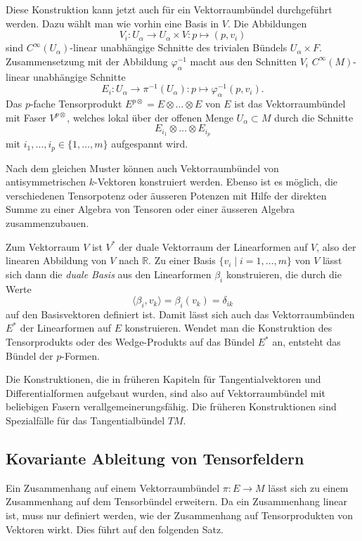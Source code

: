 Diese Konstruktion kann jetzt auch für ein Vektorraumbündel
durchgeführt werden.
Dazu wählt man wie vorhin eine Basis in $V$. 
Die Abbildungen
\[
V_i
\colon
U_\alpha \to U_\alpha\times V
:
p\mapsto (p,v_i)
\]
sind $C^\infty(U_\alpha)$-linear unabhängige Schnitte des trivialen
Bündels $U_\alpha\times F$.
Zusammensetzung mit der Abbildung $\varphi_\alpha^{-1}$ macht aus den
Schnitten $V_i$ $C^\infty(M)$-linear unabhängige Schnitte
\[
E_i
\colon
U_\alpha \to \pi^{-1}(U_\alpha)
:
p \mapsto \varphi_\alpha^{-1}(p,v_i).
\]
Das $p$-fache Tensorprodukt $E^{p\otimes}=E\otimes\dots\otimes E$ von $E$ 
ist das Vektorraumbündel mit Faser $V^{p\otimes}$, welches lokal über der
offenen Menge $U_\alpha\subset M$ durch die Schnitte 
\[
E_{i_1}\otimes \dots \otimes E_{i_p}
\]
mit
$i_1,\dots,i_p\in\{1,\dots,m\}$
aufgespannt wird.

Nach dem gleichen Muster können auch Vektorraumbündel von
antisymmetrischen $k$-Vektoren konstruiert werden.
Ebenso ist es möglich, die verschiedenen Tensorpotenz oder
äusseren Potenzen mit Hilfe der direkten Summe zu einer Algebra
von Tensoren oder einer äusseren Algebra zusammenzubauen.

Zum Vektorraum $V$ ist $V^*$ der duale Vektorraum der Linearformen
auf $V$, also der linearen Abbildung von $V$ nach $\mathbb{R}$.
Zu einer Basis $\{v_i\mid i=1,\dots,m\}$ von $V$ lässt sich dann
die {\em duale Basis} aus den Linearformen $\beta_i$ konstruieren, die
%
durch die Werte
\[
\langle \beta_i,v_k\rangle
=
\beta_i (v_k)
=
\delta_{ik}
\]
auf den Basisvektoren definiert ist.
Damit lässt sich auch das Vektorraumbünden $E^*$ der Linearformen
auf $E$ konstruieren.
Wendet man die Konstruktion des Tensorprodukts oder des Wedge-Produkts
auf das Bündel $E^*$ an, entsteht das Bündel der 
$p$-Formen.

Die Konstruktionen, die in früheren Kapiteln für Tangentialvektoren
und Differentialformen aufgebaut wurden, sind also auf 
Vektorraumbündel mit beliebigen Fasern verallgemeinerungsfähig.
Die früheren Konstruktionen sind Spezialfälle für das Tangentialbündel
$TM$.

%
%
\subsection{Kovariante Ableitung von Tensorfeldern}
Ein Zusammenhang auf einem Vektorraumbündel $\pi\colon E\to M$ lässt
sich zu einem Zusammenhang auf dem Tensorbündel erweitern.
Da ein Zusammenhang linear ist, muss nur definiert werden, wie
der Zusammenhang auf Tensorprodukten von Vektoren wirkt.
Dies führt auf den folgenden Satz.

